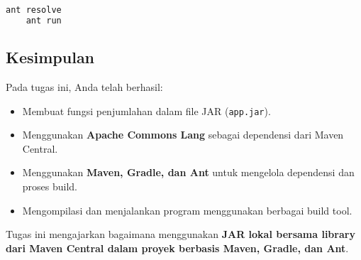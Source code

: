\begin{lstlisting}[language=bash]
	ant resolve
	ant run
\end{lstlisting}

\subsection{Kesimpulan}
Pada tugas ini, Anda telah berhasil:
\begin{itemize}
	\item Membuat fungsi penjumlahan dalam file JAR (\texttt{app.jar}).
	\item Menggunakan \textbf{Apache Commons Lang} sebagai dependensi dari Maven Central.
	\item Menggunakan \textbf{Maven, Gradle, dan Ant} untuk mengelola dependensi dan proses build.
	\item Mengompilasi dan menjalankan program menggunakan berbagai build tool.
\end{itemize}

Tugas ini mengajarkan bagaimana menggunakan \textbf{JAR lokal bersama library dari Maven Central dalam proyek berbasis Maven, Gradle, dan Ant}.
